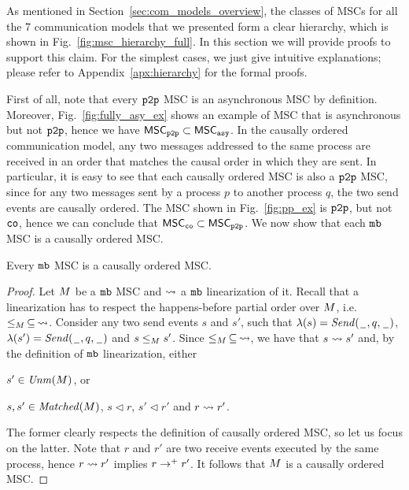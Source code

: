 
As mentioned in Section~\ref{sec:com_models_overview}, the classes of MSCs for all the 7 communication models that we presented form a clear hierarchy, which is shown in Fig.~\ref{fig:msc_hierarchy_full}. In this section we will provide proofs to support this claim. For the simplest cases, we just give intuitive explanations; please refer to Appendix~\ref{apx:hierarchy} for the formal proofs.

\medskip

First of all, note that every $\mathtt{p2p}$ MSC is an asynchronous MSC by definition. Moreover, Fig.~\ref{fig:fully_asy_ex} shows an example of MSC that is asynchronous but not $\mathtt{p2p}$, hence we have $\mathsf{MSC}_{\mathtt{p2p}} \subset \mathsf{MSC}_{\mathtt{asy}}$. 
In the causally ordered communication model, any two messages addressed to the same process are received in an order that matches the causal order in which they are sent. In particular, it is easy to see that each causally ordered MSC is also a $\mathtt{p2p}$ MSC, since for any two messages sent by a process $p$ to another process $q$, the two send events are causally ordered. The MSC shown in Fig.~\ref{fig:pp_ex} is $\mathtt{p2p}$, but not $\mathtt{co}$, hence we can conclude that $\mathsf{MSC}_{\mathtt{co}} \subset \mathsf{MSC}_{\mathtt{p2p}}$.
We now show that each $\mathtt{mb}$ MSC is a causally ordered MSC.

\begin{proposition} \label{prop:mb_is_co}
	Every $\mathtt{mb}$ MSC is a causally ordered MSC.
\end{proposition}
\begin{proof}
Let $M$ be a $\mathtt{mb}$ MSC and $\rightsquigarrow$ a $\mathtt{mb}$ linearization of it. Recall that a linearization has to respect the happens-before partial order over $M$, i.e. $\le_M \,\subseteq\, \rightsquigarrow$. Consider any two send events $s$ and $s'$, such that $\lambda(s)={\mathit{Send}(\hspace{0.1em}\underline{\hspace{0.5em}}\hspace{0.1em},q,\hspace{0.1em}\underline{\hspace{0.5em}}\hspace{0.1em})}$, $\lambda(s')={\mathit{Send}(\hspace{0.1em}\underline{\hspace{0.5em}}\hspace{0.1em},q,\hspace{0.1em}\underline{\hspace{0.5em}}\hspace{0.1em})}$ and $s \le_M s'$. Since $\le_M \,\subseteq\, \rightsquigarrow$, we have that $s \rightsquigarrow s'$ and, by the definition of $\mathtt{mb}$ linearization, either
\begin{enumerate*}[label={(\roman*)}]
	\item $s' \in \mathit{Unm}(M)$, or 
	\item $s,s' \in \mathit{Matched}(M)$, $s \lhd r$, $s' \lhd r'$ and $r \rightsquigarrow r'$. 
\end{enumerate*}
The former clearly respects the definition of causally ordered MSC, so let us focus on the latter. Note that $r$ and $r'$ are two receive events executed by the same process, hence $r \rightsquigarrow r'$ implies $r \to^+ r'$. It follows that $M$ is a causally ordered MSC.
\end{proof}

